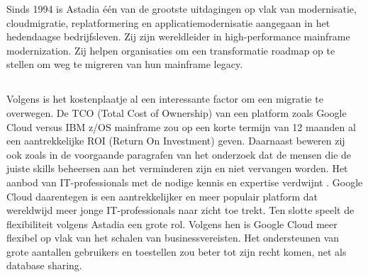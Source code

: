 Sinds 1994 is Astadia één van de grootste uitdagingen op vlak van modernisatie, cloudmigratie, replatformering en applicatiemodernisatie aangegaan in het hedendaagse bedrijfsleven. Zij zijn wereldleider in high-performance mainframe modernization. Zij helpen organisaties om een transformatie roadmap op te stellen om weg te migreren van hun mainframe legacy. 

\subsection{}
\label{sec:Waarom zouden we onze mainframe legacy en databases migreren naar Google Cloud?}

Volgens \textcite{Astadia2021} is het kostenplaatje al een interessante factor om een migratie te overwegen. De TCO (Total Cost of Ownership) van een platform zoals Google Cloud versus IBM z/OS mainframe zou op een korte termijn van 12 maanden al een aantrekkelijke ROI (Return On Investment) geven. Daarnaast beweren zij ook zoals in de voorgaande paragrafen van het onderzoek dat de mensen die de juiste skills beheersen aan het verminderen zijn en niet vervangen worden. Het aanbod van IT-professionals met de nodige kennis en expertise verdwijnt \autocite{Astadia2021}. Google Cloud daarentegen is een aantrekkelijker en meer populair platform dat wereldwijd meer jonge IT-professionals naar zicht toe trekt. Ten slotte speelt de flexibiliteit volgens Astadia een grote rol. Volgens hen is Google Cloud meer flexibel op vlak van het schalen van businessvereisten. Het ondersteunen van grote aantallen gebruikers en toestellen zou beter tot zijn recht komen, net als database sharing. 

